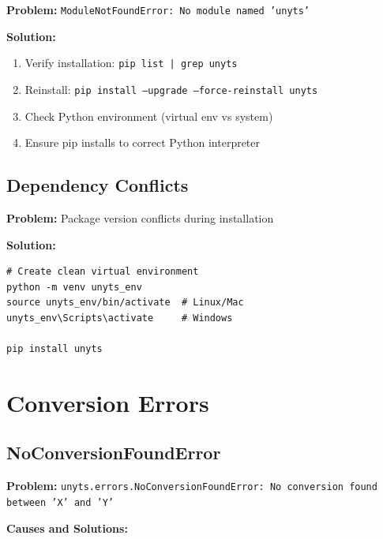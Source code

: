 \documentclass[11pt,a4paper]{report}
\begin{document}
\textbf{Problem:} \texttt{ModuleNotFoundError: No module named 'unyts'}

\textbf{Solution:}
\begin{enumerate}
\item Verify installation: \texttt{pip list | grep unyts}
\item Reinstall: \texttt{pip install --upgrade --force-reinstall unyts}
\item Check Python environment (virtual env vs system)
\item Ensure pip installs to correct Python interpreter
\end{enumerate}

\subsection{Dependency Conflicts}

\textbf{Problem:} Package version conflicts during installation

\textbf{Solution:}
\begin{lstlisting}[style=pythonstyle]
# Create clean virtual environment
python -m venv unyts_env
source unyts_env/bin/activate  # Linux/Mac
unyts_env\Scripts\activate     # Windows

pip install unyts
\end{lstlisting}

\section{Conversion Errors}

\subsection{NoConversionFoundError}

\textbf{Problem:} \texttt{unyts.errors.NoConversionFoundError: No conversion found between 'X' and 'Y'}

\textbf{Causes and Solutions:}
\end{document}
